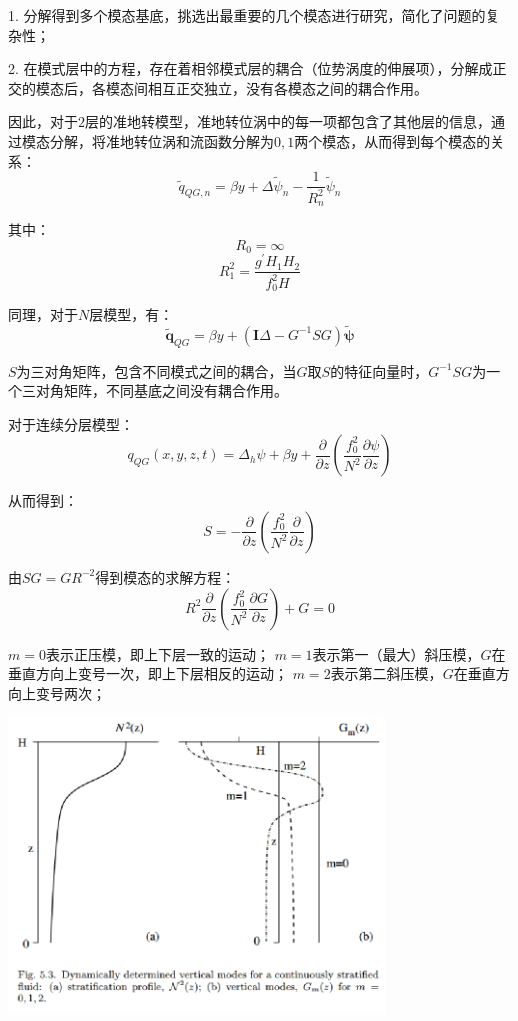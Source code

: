 \documentclass{article}
\begin{document}
1. 分解得到多个模态基底，挑选出最重要的几个模态进行研究，简化了问题的复杂性；

2. 在模式层中的方程，存在着相邻模式层的耦合（位势涡度的伸展项），分解成正交的模态后，各模态间相互正交独立，没有各模态之间的耦合作用。

因此，对于$2$层的准地转模型，准地转位涡中的每一项都包含了其他层的信息，通过模态分解，将准地转位涡和流函数分解为$0,1$两个模态，从而得到每个模态的关系：
$$\tilde{q}_{QG,n} = \beta y + \Delta \tilde{\psi}_n - \frac{1}{R_n^2}\tilde{\psi}_n$$

其中：
$$R_0 = \infty$$
$$R_1^2 = \frac{g^{\prime}H_1H_2}{f_0^2H}$$

同理，对于$N$层模型，有：
$$\tilde{\mathbf{q}}_{QG} = \beta y + (\mathbf{I}\Delta - G^{-1}SG)\tilde{\mathbf{\psi}}$$

$S$为三对角矩阵，包含不同模式之间的耦合，当$G$取$S$的特征向量时，$G^{-1}SG$为一个三对角矩阵，不同基底之间没有耦合作用。

对于连续分层模型：
$$q_{QG}(x,y,z,t) = \Delta_h \psi + \beta y + \frac{\partial}{\partial z}\left(\frac{f_0^2}{N^2}\frac{\partial\psi}{\partial z}\right)$$

从而得到：
$$S = -\frac{\partial}{\partial z}\left(\frac{f_0^2}{N^2}\frac{\partial}{\partial z}\right)$$

由$SG=GR^{-2}$得到模态的求解方程：
$$  R^2\frac{\partial}{\partial z}\left(\frac{f_0^2}{N^2}\frac{\partial G}{\partial z}\right) + G=0$$

$m=0$表示正压模，即上下层一致的运动；
$m=1$表示第一（最大）斜压模，$G$在垂直方向上变号一次，即上下层相反的运动；
$m=2$表示第二斜压模，$G$在垂直方向上变号两次；
\begin{center}
    \includegraphics[width=10cm]{Fig4_2.png}
\end{center}
\end{document}
